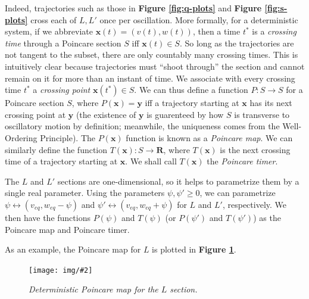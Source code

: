 \documentclass[letterpaper,12pt]{article}
\numberwithin{table}{section}
\numberwithin{figure}{section}
\numberwithin{equation}{section}
\newcommand{\centerfig}[2]{\begin{center}\texttt{[image: img/\#2]}\end{center}}
\newcommand{\ccaption}[1]{\caption{\textit{#1}}}
\newcommand{\reffig}[1]{\textbf{Figure \ref{#1}}}
\begin{document}
\begin{flushleft}
    Indeed, trajectories such as those in \reffig{fig:q-plots} and \reffig{fig:s-plots} cross each of $L, L'$ once per oscillation. More formally, for a deterministic system, if we abbreviate $\mathbf{x}(t) = (v(t), w(t))$, then a time $t^*$ is a \textit{crossing time} through a Poincare section $S$ iff $\mathbf{x}(t) \in S$. So long as the trajectories are not tangent to the subset, there are only countably many crossing times. This is intuitively clear because trajectories must ``shoot through'' the section and cannot remain on it for more than an instant of time. We associate with every crossing time $t^*$ a \textit{crossing point} $\mathbf{x}(t^\ast) \in S$. We can thus define a function $P: S \to S$ for a Poincare section $S$, where $P(\mathbf{x}) = \mathbf{y}$ iff a trajectory starting at $\mathbf{x}$ has its next crossing point at $\mathbf{y}$ (the existence of $\mathbf{y}$ is guarenteed by how $S$ is transverse to oscillatory motion by definition; meanwhile, the uniqueness comes from the Well-Ordering Principle). The $P(\mathbf{x})$ function is known as a \textit{Poincare map}. We can similarly define the function $T(\mathbf{x}) : S \to \mathbf{R}$, where $T(\mathbf{x})$ is the next crossing time of a trajectory starting at $\mathbf{x}$. We shall call $T(\mathbf{x})$ the \textit{Poincare timer}.

    The $L$ and $L'$ sections are one-dimensional, so it helps to parametrize them by a single real parameter. Using the parameters $\psi, \psi' \geq 0$, we can parametrize $\psi \leftrightarrow (v_{eq}, w_{eq} - \psi)$ and $\psi' \leftrightarrow (v_{eq}, w_{eq} + \psi)$ for $L$ and $L'$, respectively. We then have the functions $P(\psi)$ and $T(\psi)$ (or $P(\psi')$ and $T(\psi')$) as the Poincare map and Poincare timer.

    As an example, the Poincare map for $L$ is plotted in \reffig{fig:pmap-det}.
    \begin{figure}[h]

        \centering
 
        \centerfig{0.8}{pmap-det.jpg}
    
        \captionsetup{width=0.75\linewidth}
        \ccaption{Deterministic Poincare map for the $L$ section.}
        \label{fig:pmap-det}
    

\end{figure}
\end{flushleft}
\end{document}
